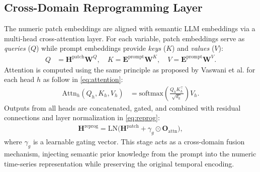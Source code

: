 \documentclass[conference]{IEEEtran}
\begin{document}
\subsection{Cross-Domain Reprogramming Layer}
The numeric patch embeddings are aligned with semantic LLM embeddings via a multi-head cross-attention layer.
For each variable, patch embeddings serve as \emph{queries} ($Q$) while prompt embeddings provide \emph{keys} ($K$) and \emph{values} ($V$):
\begin{align}
Q &= \mathbf{H}^{\text{patch}} \mathbf{W}^Q, \quad
K = \mathbf{E}^{\text{prompt}} \mathbf{W}^K, \quad
V = \mathbf{E}^{\text{prompt}} \mathbf{W}^V.
\end{align}
Attention is computed using the same principle as proposed by Vaswani et al. \cite{Vaswani2017Attention} for each head $h$ as follow in \eqref{eq:attention}:
\begin{align}
\text{Attn}_h(Q_h, K_h, V_h) &= \text{softmax}\left(\frac{Q_h K_h^\top}{\sqrt{d_k}}\right) V_h.
\label{eq:attention}
\end{align}
Outputs from all heads are concatenated, gated, and combined with residual connections and layer normalization in \eqref{eq:reprog}:
\begin{align}
\mathbf{H}^{\text{reprog}} = \text{LN}\big(\mathbf{H}^{\text{patch}} + \gamma_g \odot \mathbf{O}_{\text{attn}}\big),
\label{eq:reprog}
\end{align}
where $\gamma_g$ is a learnable gating vector.
This stage acts as a cross-domain fusion mechanism, injecting semantic prior knowledge from the prompt into the numeric time-series representation while preserving the original temporal encoding.
\end{document}
